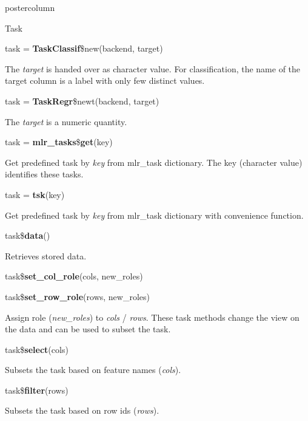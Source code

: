 \documentclass{beamer}
\begin{document}
\begin{frame}[fragile]{}
\begin{columns}
\begin{column}{.245\textwidth}
\begin{beamercolorbox}[center]{postercolumn}
\begin{minipage}{.98\textwidth}
{\begin{myblock}{Task}
						\\
						\begin{codebox}
							task = \textbf{TaskClassif}\$new(backend, target)
						\end{codebox}
						The \textit{target} is handed over as character value. For classification, the name of the target column is a label with only few distinct values.
						\\
						\begin{codebox}
							task = \textbf{TaskRegr}\$newt(backend, target)
						\end{codebox}
						The \textit{target} is a numeric quantity.
						\\
						\begin{codebox}
							task = \textbf{mlr\_tasks}\$\textbf{get}(key)
						\end{codebox}
						Get predefined task by \textit{key} from mlr\_task dictionary. The key (character value) identifies these tasks. 
						\\
						\begin{codebox}
							task = \textbf{tsk}(key)
						\end{codebox}
						Get predefined task by \textit{key} from mlr\_task dictionary with convenience function.
						\\
						\begin{codebox}
							task\$\textbf{data}()
						\end{codebox}
						Retrieves stored data.
						\\
						\begin{codebox}
							task\$\textbf{set\_col\_role}(cols, new\_roles)
						\end{codebox}
						\begin{codebox}
							task\$\textbf{set\_row\_role}(rows, new\_roles)
						\end{codebox}
						 Assign role (\textit{new\_roles}) to \textit{cols} / \textit{rows}. These task methods change the view on the data and can be used to subset the task.
						\\
						\begin{codebox}
							task\$\textbf{select}(cols)
						\end{codebox}
						Subsets the task based on feature names (\textit{cols}).
						\\
						\begin{codebox}
							task\$\textbf{filter}(rows)
						\end{codebox}
						Subsets the task based on row ids (\textit{rows}).

\end{myblock}}
\end{minipage}
\end{beamercolorbox}
\end{column}
\end{columns}
\end{frame}
\end{document}
